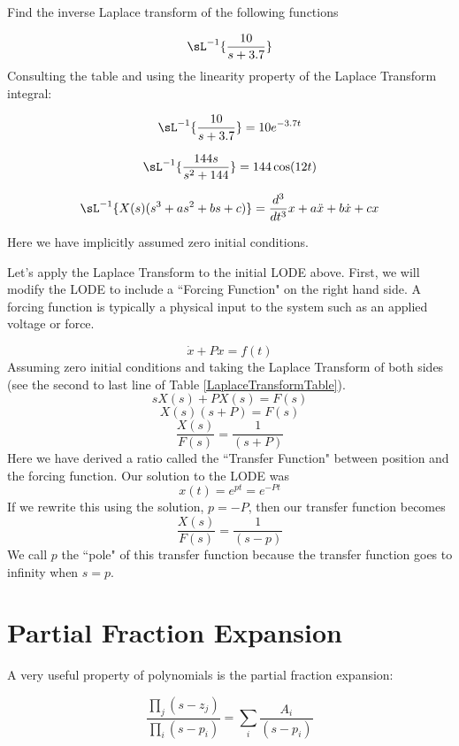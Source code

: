 \begin{ExampleSmall}
Find the inverse Laplace transform of the following functions

\vspace{0.2in}

\[
\sL^{-1}\{\frac{10}{s+3.7}  \}
\]
Consulting the table and using the linearity property of the Laplace Transform integral:


\[
\sL^{-1}\{\frac{10}{s+3.7}  \}  = 10e^{-3.7t}
\]
\vspace{0.2in}


\[
\sL^{-1}\{ \frac{144s}{s^2 + 144} \}  = 144\cos(12t)
\]

\vspace{0.2in}


\[
\sL^{-1}\{ X(s)(s^3 + as^2 + bs+c) \} = \frac{d^3}{dt^3}x + a\ddot{x} + b\dot{x} + cx
\]

Here we have implicitly assumed zero initial conditions.

\end{ExampleSmall}


Let's apply the Laplace Transform to the initial LODE above.  First, we will modify the LODE to include a ``Forcing Function" on the right hand side.  A forcing function is typically a physical input to the system such as an applied voltage or force.

\[
\dot{x} + Px = f(t)
\]
Assuming zero initial conditions and taking the Laplace Transform of both sides (see the second to last line of Table \ref{LaplaceTransformTable}).
\[
sX(s) + PX(s) = F(s)
\]
\[
X(s) (s+P) = F(s)
\]
\[
\frac{X(s)}{F(s)} = \frac {1}  {(s+P)}
\]
Here we have derived a ratio called the ``Transfer Function" between position and the forcing function.  Our solution to the LODE was
\[
x(t) =  e^{pt} =  e^{-Pt}
\]
If we rewrite this using the solution, $p = -P$, then our transfer function becomes
\[
\frac{X(s)}{F(s)} = \frac {1}  {(s-p)}
\]
We call $p$ the ``pole" of this transfer function because the transfer function goes to infinity when $s=p$.



\section{Partial Fraction Expansion}\label{partialfractionsection}

A very useful property of polynomials is the partial fraction expansion:

\[
\frac{\prod_j (s-z_j)}{\prod_i (s-p_i)}    =  \sum_i  \frac{A_i}{(s-p_i)}
\]

